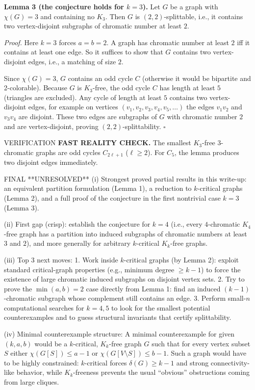 \medskip
\textbf{Lemma 3 (the conjecture holds for $k=3$).}
Let $G$ be a graph with $\chi(G)=3$ and containing no $K_3$.
Then $G$ is $(2,2)$-splittable, i.e., it contains two vertex-disjoint subgraphs
of chromatic number at least $2$.

\emph{Proof.}
Here $k=3$ forces $a=b=2$.
A graph has chromatic number at least $2$ iff it contains at least one edge.
So it suffices to show that $G$ contains two vertex-disjoint edges, i.e., a
matching of size $2$.

Since $\chi(G)=3$, $G$ contains an odd cycle $C$ (otherwise it would be bipartite
and 2-colorable). Because $G$ is $K_3$-free, the odd cycle $C$ has length at
least $5$ (triangles are excluded).
Any cycle of length at least $5$ contains two vertex-disjoint edges, for example
on vertices $(v_1,v_2,v_3,v_4,v_5,\dots)$ the edges $v_1v_2$ and $v_3v_4$ are
disjoint.
These two edges are subgraphs of $G$ with chromatic number $2$ and are
vertex-disjoint, proving $(2,2)$-splittability.
\hfill $\square$

VERIFICATION
\textbf{FAST REALITY CHECK.}
The smallest $K_3$-free $3$-chromatic graphs are odd cycles $C_{2\ell+1}$
($\ell\ge2$). For $C_5$, the lemma produces two disjoint edges immediately.

FINAL
**UNRESOLVED**
(i) Strongest proved partial results in this write-up: an equivalent partition
formulation (Lemma 1), a reduction to $k$-critical graphs (Lemma 2), and a full
proof of the conjecture in the first nontrivial case $k=3$ (Lemma 3).

(ii) First gap (crisp): establish the conjecture for $k=4$ (i.e., every
$4$-chromatic $K_4$-free graph has a partition into induced subgraphs of
chromatic numbers at least $3$ and $2$), and more generally for arbitrary
$k$-critical $K_k$-free graphs.

(iii) Top 3 next moves:
1. Work inside $k$-critical graphs (by Lemma 2): exploit standard critical-graph
properties (e.g., minimum degree $\ge k-1$) to force the existence of large
chromatic induced subgraphs on disjoint vertex sets.
2. Try to prove the $\min(a,b)=2$ case directly from Lemma 1: find an induced
$(k-1)$-chromatic subgraph whose complement still contains an edge.
3. Perform small-$n$ computational searches for $k=4,5$ to look for the smallest
potential counterexamples and to guess structural invariants that certify
splittability.

(iv) Minimal counterexample structure:
A minimal counterexample for given $(k,a,b)$ would be a $k$-critical,
$K_k$-free graph $G$ such that for every vertex subset $S$ either
$\chi(G[S])\le a-1$ or $\chi(G[V\setminus S])\le b-1$.
Such a graph would have to be highly constrained: $k$-critical forces
$\delta(G)\ge k-1$ and strong connectivity-like behavior, while $K_k$-freeness
prevents the usual ``obvious'' obstructions coming from large cliques.




